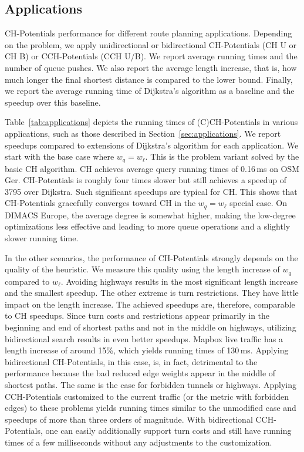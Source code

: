 \documentclass[manuscript]{acmart}
\begin{document}
\subsection{Applications}

\begin{table}
\centering
\caption{
CH-Potentials performance for different route planning applications.
Depending on the problem, we apply unidirectional or bidirectional CH-Potentials (CH U or CH B) or CCH-Potentials (CCH U/B).
We report average running times and the number of queue pushes.
We also report the average length increase, that is, how much longer the final shortest distance is compared to the lower bound.
Finally, we report the average running time of Dijkstra's algorithm as a baseline and the speedup over this baseline.
}\label{tab:applications}

\end{table}

Table~\ref{tab:applications} depicts the running times of (C)CH-Potentials in various applications, such as those described in Section~\ref{sec:applications}.
We report speedups compared to extensions of Dijkstra's algorithm for each application.
We start with the base case where $w_q = w_\ell$.
This is the problem variant solved by the basic CH algorithm.
CH achieves average query running times of 0.16\,ms on OSM Ger.
CH-Potentials is roughly four times slower but still achieves a speedup of 3795 over Dijkstra.
Such significant speedups are typical for CH.
This shows that CH-Potentials gracefully converges toward CH in the $w_q = w_\ell$ special case.
On DIMACS Europe, the average degree is somewhat higher, making the low-degree optimizations less effective and leading to more queue operations and a slightly slower running time.

In the other scenarios, the performance of CH-Potentials strongly depends on the quality of the heuristic.
We measure this quality using the length increase of $w_q$ compared to $w_\ell$.
Avoiding highways results in the most significant length increase and the smallest speedup.
The other extreme is turn restrictions.
They have little impact on the length increase.
The achieved speedups are, therefore, comparable to CH speedups.
Since turn costs and restrictions appear primarily in the beginning and end of shortest paths and not in the middle on highways, utilizing bidirectional search results in even better speedups.
Mapbox live traffic has a length increase of around 15\%, which yields running times of 130\,ms.
Applying bidirectional CH-Potentials, in this case, is, in fact, detrimental to the performance because the bad reduced edge weights appear in the middle of shortest paths.
The same is the case for forbidden tunnels or highways.
Applying CCH-Potentials customized to the current traffic (or the metric with forbidden edges) to these problems yields running times similar to the unmodified case and speedups of more than three orders of magnitude.
With bidirectional CCH-Potentials, one can easily additionally support turn costs and still have running times of a few milliseconds without any adjustments to the customization.
\end{document}
